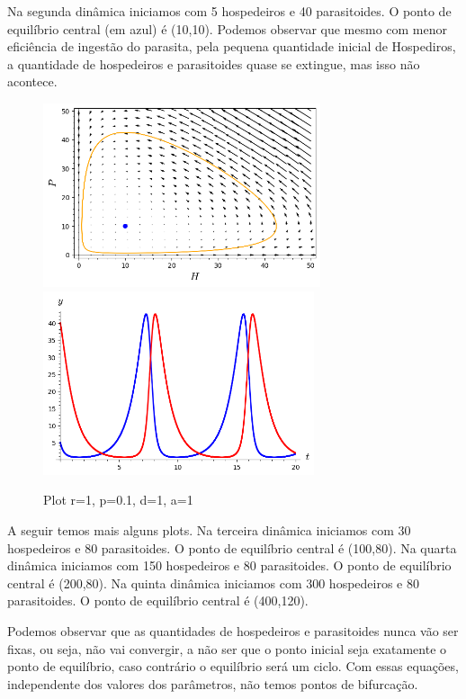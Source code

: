 Na segunda dinâmica iniciamos com 5 hospedeiros e 40 parasitoides. O ponto de equilíbrio central (em azul) é (10,10). Podemos observar que mesmo com menor eficiência de ingestão do parasita, pela pequena quantidade inicial de Hospediros, a quantidade de hospedeiros e parasitoides quase se extingue, mas isso não acontece.
\begin{figure}[h!]
\begin{center}
	\includegraphics[height=5.4cm]{Img/HP (r=1,p=0.1, d=1,a=1); (5, 40); (10, 10).png} \quad
	\includegraphics[height=5.4cm]{Img/T (r=1,p=0.1, d=1,a=1); (5, 40); (10, 10).png}
\caption{Plot r=1, p=0.1, d=1, a=1} \label{gdimotes}
\end{center}
\end{figure}


A seguir temos mais alguns plots. Na terceira dinâmica iniciamos com 30 hospedeiros e 80 parasitoides. O ponto de equilíbrio central é (100,80). Na quarta dinâmica iniciamos com 150 hospedeiros e 80 parasitoides. O ponto de equilíbrio central é (200,80). Na quinta dinâmica iniciamos com 300 hospedeiros e 80 parasitoides. O ponto de equilíbrio central é (400,120).

Podemos observar que as quantidades de hospedeiros e parasitoides nunca vão ser fixas, ou seja, não vai convergir, a não ser que o ponto inicial seja exatamente o ponto de equilíbrio, caso contrário o equilíbrio será um ciclo. Com essas equações, independente dos valores dos parâmetros, não temos pontos de bifurcação.
\newpage


